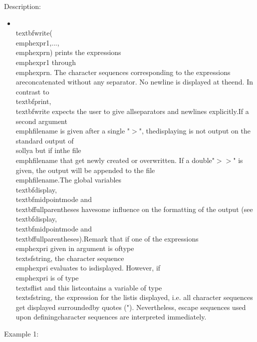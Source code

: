 \noindent Description: \begin{itemize}

\item \\textbf{write}(\\emph{expr1},...,\\emph{exprn}) prints the expressions \\emph{expr1} through\n   \\emph{exprn}. The character sequences corresponding to the expressions are\n   concatenated without any separator. No newline is displayed at the\n   end.  In contrast to \\textbf{print}, \\textbf{write} expects the user to give all\n   separators and newlines explicitly.\n    \n   If a second argument \\emph{filename} is given after a single "$>$", the\n   displaying is not output on the standard output of \\sollya but if in\n   the file \\emph{filename} that get newly created or overwritten. If a double\n    "$>>$" is given, the output will be appended to the file \\emph{filename}.\n    \n   The global variables \\textbf{display}, \\textbf{midpointmode} and \\textbf{fullparentheses} have\n   some influence on the formatting of the output (see \\textbf{display},\n   \\textbf{midpointmode} and \\textbf{fullparentheses}).\n    \n   Remark that if one of the expressions \\emph{expri} given in argument is of\n   type \\textsf{string}, the character sequence \\emph{expri} evaluates to is\n   displayed. However, if \\emph{expri} is of type \\textsf{list} and this list\n   contains a variable of type \\textsf{string}, the expression for the list\n   is displayed, i.e.  all character sequences get displayed surrounded\n   by quotes ("). Nevertheless, escape sequences used upon defining\n   character sequences are interpreted immediately.\n\end{itemize}
\noindent Example 1: 
